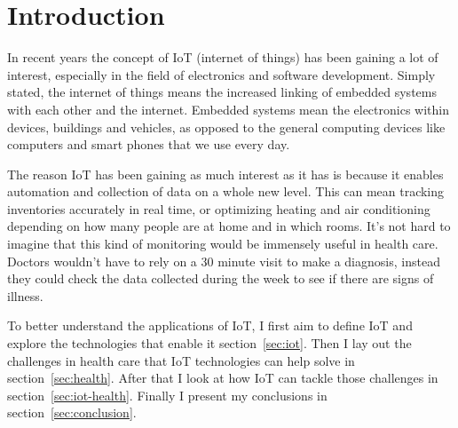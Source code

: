 \section{Introduction}

In recent years the concept of IoT (internet of things) has been gaining a lot
of interest, especially in the field of electronics and software development.
Simply stated, the internet of things means the increased linking of embedded
systems with each other and the internet. Embedded systems mean the electronics
within devices, buildings and vehicles, as opposed to the general computing
devices like computers and smart phones that we use every day.

The reason IoT has been gaining as much interest as it has is because it
enables automation and collection of data on a whole new level. This can mean
tracking inventories accurately in real time, or optimizing heating and air
conditioning depending on how many people are at home and in which rooms. It's
not hard to imagine that this kind of monitoring would be immensely useful in
health care. Doctors wouldn't have to rely on a 30 minute visit to make a
diagnosis, instead they could check the data collected during the week to see
if there are signs of illness.

To better understand the applications of IoT, I first aim to define IoT and
explore the technologies that enable it section~\ref{sec:iot}. Then I lay out
the challenges in health care that IoT technologies can help solve in
section~\ref{sec:health}. After that I look at how IoT can tackle those
challenges in section~\ref{sec:iot-health}.  Finally I present my conclusions
in section~\ref{sec:conclusion}.

